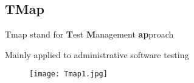 \subsection{TMap}
Tmap stand for \textbf{T}est \textbf{M}anagement \textbf{ap}proach

Mainly applied to administrative software testing

\begin{figure}[h!]
	\centering
	\texttt{[image: Tmap1.jpg]}
	\caption{}
	\label{fig:tmap1}
\end{figure}

